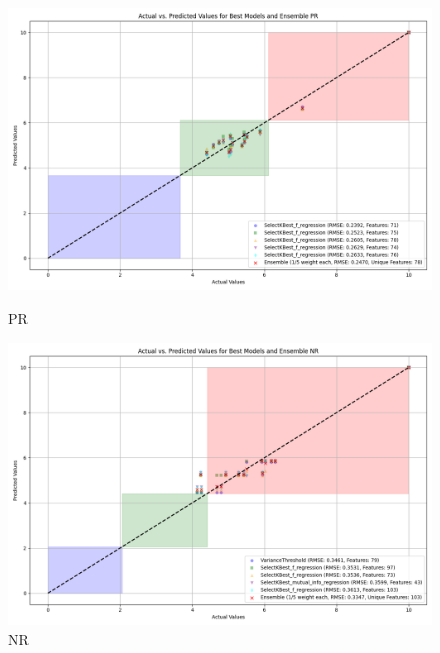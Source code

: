 \begin{figure}[H]
    \centering
    \begin{minipage}{0.45\textwidth}
        \centering
        \includegraphics[width=\linewidth]{reg_section_all/images_reg_featred_ensemble/actual_vs_predicted_best_feature_selection_and_ensemble_PR.png}
        \caption{PR}
        \label{fig:pr_reg_featred_best_ensemble}
    \end{minipage}\hfill
    \begin{minipage}{0.45\textwidth}
        \centering
        \includegraphics[width=\linewidth]{reg_section_all/images_reg_featred_ensemble/actual_vs_predicted_best_feature_selection_and_ensemble_NR.png}
        \caption{NR}
        \label{fig:nr_reg_featred_best_ensemble}
    \end{minipage}
\end{figure}

